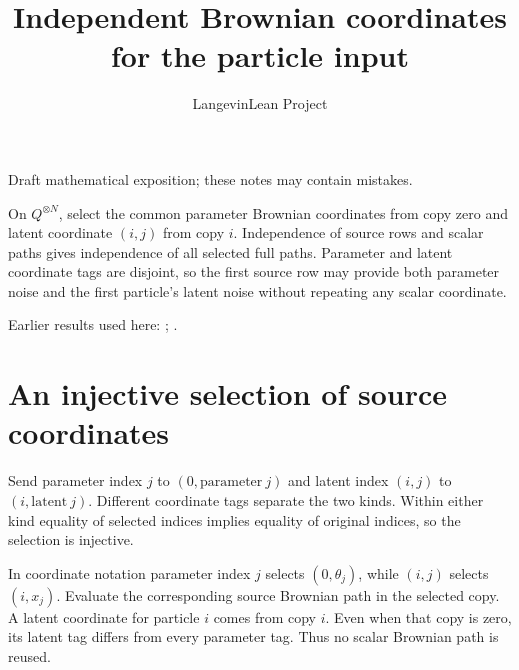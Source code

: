 \documentclass[11pt,a4paper]{article}
\title{\texorpdfstring{Independent Brownian coordinates for the particle input}{Independent Brownian coordinates for the particle input}}
\author{LangevinLean Project}
\date{}
\begin{document}
\maketitle
Draft mathematical exposition; these notes may contain mistakes.


On \(Q^{\otimes N}\), select the common parameter Brownian coordinates from copy zero and latent coordinate \((i,j)\) from copy \(i\). Independence of source rows and scalar paths gives independence of all selected full paths. Parameter and latent coordinate tags are disjoint, so the first source row may provide both parameter noise and the first particle’s latent noise without repeating any scalar coordinate.



Earlier results used here: \cite[Section~3.32]{LangevinLean2026ULASC}; \cite[Section~3.8]{LangevinLean2026ULASC}.

\section{\texorpdfstring{An injective selection of source coordinates}{An injective selection of source coordinates}}


Send parameter index \(j\) to \((0,\mathrm{parameter}\ j)\) and latent index \((i,j)\) to \((i,\mathrm{latent}\ j)\). Different coordinate tags separate the two kinds. Within either kind equality of selected indices implies equality of original indices, so the selection is injective.



In coordinate notation parameter index \(j\) selects \((0,\theta_j)\), while \((i,j)\) selects \((i,x_j)\). Evaluate the corresponding source Brownian path in the selected copy. A latent coordinate for particle \(i\) comes from copy \(i\). Even when that copy is zero, its latent tag differs from every parameter tag. Thus no scalar Brownian path is reused.
\end{document}
